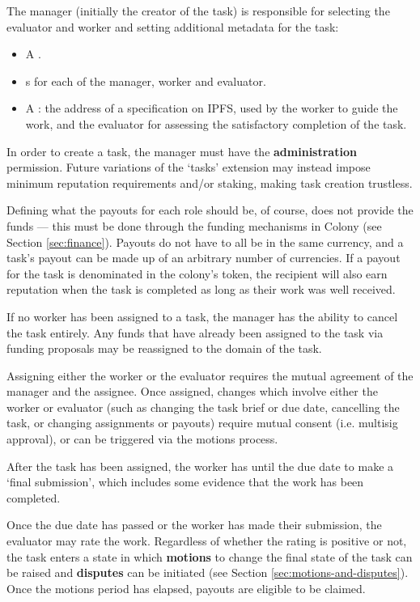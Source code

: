 The manager (initially the creator of the task) is responsible for selecting the evaluator and worker and setting additional metadata for the task:

\begin{itemize}
\item A .
\item {}s for each of the manager, worker and evaluator.
\item A : the address of a specification on IPFS, used by the worker to guide the work, and the evaluator for assessing the satisfactory completion of the task.
\end{itemize}

In order to create a task, the manager must have the \textbf{administration} permission. Future variations of the `tasks' extension may instead impose minimum reputation requirements and/or staking, making task creation trustless.

Defining what the payouts for each role should be, of course, does not provide the funds --- this must be done through the funding mechanisms in Colony (see Section \ref{sec:finance}). Payouts do not have to all be in the same currency, and a task's payout can be made up of an arbitrary number of currencies. If a payout for the task is denominated in the colony's token, the recipient will also earn reputation when the task is completed as long as their work was well received.

If no worker has been assigned to a task, the manager has the ability to cancel the task entirely. Any funds that have already been assigned to the task via funding proposals may be reassigned to the domain of the task.

Assigning either the worker or the evaluator requires the mutual agreement of the manager and the assignee. Once assigned, changes which involve either the worker or evaluator (such as changing the task brief or due date, cancelling the task, or changing assignments or payouts) require mutual consent (i.e. multisig approval), or can be triggered via the motions process.

After the task has been assigned, the worker has until the due date to make a `final submission', which includes some evidence that the work has been completed.

Once the due date has passed or the worker has made their submission, the evaluator may rate the work. Regardless of whether the rating is positive or not, the task enters a state in which \textbf{motions} to change the final state of the task can be raised and \textbf{disputes} can be initiated (see Section \ref{sec:motions-and-disputes}). Once the motions period has elapsed, payouts are eligible to be claimed. \\

